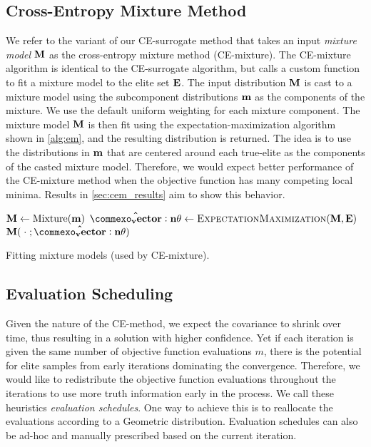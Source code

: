 \subsection{Cross-Entropy Mixture Method} \label{sec:cem_alg_ce_mixture}
We refer to the variant of our CE-surrogate method that takes an input \textit{mixture model} $\mathbf{M}$ as the cross-entropy mixture method (CE-mixture).
The CE-mixture algorithm is identical to the CE-surrogate algorithm, but calls a custom  function to fit a mixture model to the elite set $\mathbf{E}$.
The input distribution $\mathbf{M}$ is cast to a mixture model using the subcomponent distributions $\mathbf{m}$ as the components of the mixture.
We use the default uniform weighting for each mixture component.
The mixture model $\mathbf{M}$ is then fit using the expectation-maximization algorithm shown in \cref{alg:em}, and the resulting distribution is returned.
The idea is to use the distributions in $\mathbf{m}$ that are centered around each true-elite as the components of the casted mixture model.
Therefore, we would expect better performance of the CE-mixture method when the objective function has many competing local minima.
Results in \cref{sec:cem_results} aim to show this behavior.

\begin{algorithm}[ht]
  \begin{algorithmic}
    \State $\mathbf{M} \leftarrow \operatorname{Mixture}( \mathbf{m} )$
    \State $\mathbf{\hat{\vec{\theta}}} \leftarrow \textproc{ExpectationMaximization}(\M, \bfE)$
    \State \Return $\M(\;\cdot\;; \mathbf{\hat{\vec{\theta}}})$
  \EndFunction
  \end{algorithmic}
  \caption{\label{alg:ce_mixture_fit} Fitting mixture models (used by CE-mixture).}
\end{algorithm}


\subsection{Evaluation Scheduling} \label{sec:cem_alg_eval_schedule}
Given the nature of the CE-method, we expect the covariance to shrink over time, thus resulting in a solution with higher confidence.
Yet if each iteration is given the same number of objective function evaluations $m$, there is the potential for elite samples from early iterations dominating the convergence.
Therefore, we would like to redistribute the objective function evaluations throughout the iterations to use more truth information early in the process.
We call these heuristics \textit{evaluation schedules}.
One way to achieve this is to reallocate the evaluations according to a Geometric distribution.
Evaluation schedules can also be ad-hoc and manually prescribed based on the current iteration.

